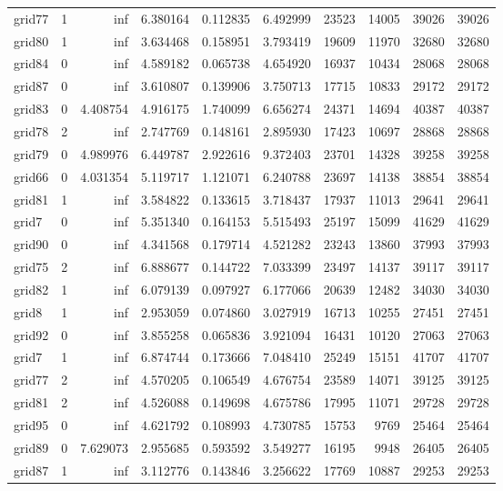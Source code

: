 \begin{longtable}{|l|r|r|r|r|r|r|r|r|r|}
grid77 & 1 & inf & 6.380164 & 0.112835 & 6.492999 & 23523 & 14005 & 39026 & 39026 \\
grid80 & 1 & inf & 3.634468 & 0.158951 & 3.793419 & 19609 & 11970 & 32680 & 32680 \\
grid84 & 0 & inf & 4.589182 & 0.065738 & 4.654920 & 16937 & 10434 & 28068 & 28068 \\
grid87 & 0 & inf & 3.610807 & 0.139906 & 3.750713 & 17715 & 10833 & 29172 & 29172 \\
grid83 & 0 & 4.408754 & 4.916175 & 1.740099 & 6.656274 & 24371 & 14694 & 40387 & 40387 \\
grid78 & 2 & inf & 2.747769 & 0.148161 & 2.895930 & 17423 & 10697 & 28868 & 28868 \\
grid79 & 0 & 4.989976 & 6.449787 & 2.922616 & 9.372403 & 23701 & 14328 & 39258 & 39258 \\
grid66 & 0 & 4.031354 & 5.119717 & 1.121071 & 6.240788 & 23697 & 14138 & 38854 & 38854 \\
grid81 & 1 & inf & 3.584822 & 0.133615 & 3.718437 & 17937 & 11013 & 29641 & 29641 \\
grid7 & 0 & inf & 5.351340 & 0.164153 & 5.515493 & 25197 & 15099 & 41629 & 41629 \\
grid90 & 0 & inf & 4.341568 & 0.179714 & 4.521282 & 23243 & 13860 & 37993 & 37993 \\
grid75 & 2 & inf & 6.888677 & 0.144722 & 7.033399 & 23497 & 14137 & 39117 & 39117 \\
grid82 & 1 & inf & 6.079139 & 0.097927 & 6.177066 & 20639 & 12482 & 34030 & 34030 \\
grid8 & 1 & inf & 2.953059 & 0.074860 & 3.027919 & 16713 & 10255 & 27451 & 27451 \\
grid92 & 0 & inf & 3.855258 & 0.065836 & 3.921094 & 16431 & 10120 & 27063 & 27063 \\
grid7 & 1 & inf & 6.874744 & 0.173666 & 7.048410 & 25249 & 15151 & 41707 & 41707 \\
grid77 & 2 & inf & 4.570205 & 0.106549 & 4.676754 & 23589 & 14071 & 39125 & 39125 \\
grid81 & 2 & inf & 4.526088 & 0.149698 & 4.675786 & 17995 & 11071 & 29728 & 29728 \\
grid95 & 0 & inf & 4.621792 & 0.108993 & 4.730785 & 15753 & 9769 & 25464 & 25464 \\
grid89 & 0 & 7.629073 & 2.955685 & 0.593592 & 3.549277 & 16195 & 9948 & 26405 & 26405 \\
grid87 & 1 & inf & 3.112776 & 0.143846 & 3.256622 & 17769 & 10887 & 29253 & 29253 \\

\end{longtable}
